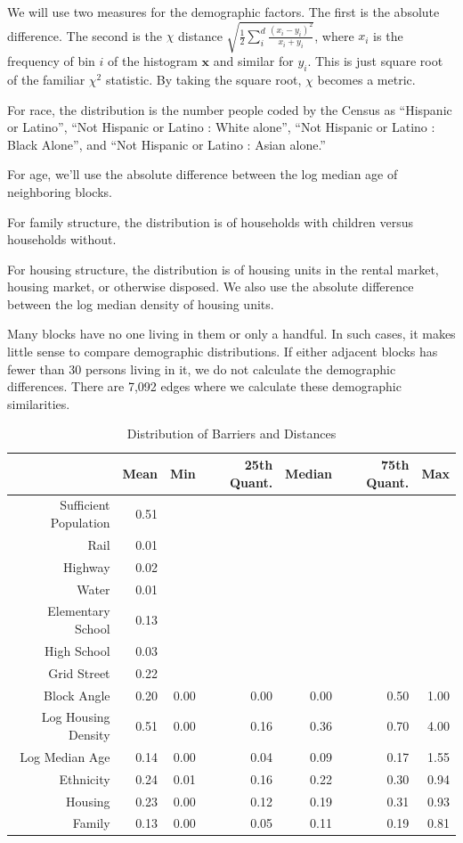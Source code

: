 \documentclass[12pt,letter]{article}\usepackage[]{graphicx}\usepackage[]{color}
\begin{document}
We will use two measures for the demographic factors. The first is the
absolute difference. The second is the $\chi$ distance $\sqrt{
\frac{1}{2} \sum_i^d \frac{(x_i - y_i)^2}{x_i + y_i}}$, where $x_i$ is
the frequency of bin $i$ of the histogram $\mathbf{x}$ and similar for
$y_i$. This is just square root of the familiar $\chi^2$ statistic. By
taking the square root, $\chi$ becomes a metric.\cite{pele_distance_2011}

For race, the distribution is the number people coded by the Census as
``Hispanic or Latino'', ``Not Hispanic or Latino : White alone'', ``Not Hispanic
or Latino : Black Alone'', and ``Not Hispanic or Latino : Asian alone.''

For age, we'll use the absolute difference between the log median age of
neighboring blocks.

For family structure, the distribution is of households with children
versus households without. 

For housing structure, the distribution is of housing units in the
rental market, housing market, or otherwise disposed. We also use the
absolute difference between the log median density of housing units.

Many blocks have no one living in them or only a handful. In such
cases, it makes little sense to compare demographic distributions. If
either adjacent blocks has fewer than 30 persons living in it, we do
not calculate the demographic differences. There are
7,092 edges where we calculate these
demographic similarities.

\begin{table}[ht]
\centering
\begin{tabular}{rrrrrrr}
  \hline
 & Mean & Min & 25th Quant. & Median & 75th Quant. & Max \\ 
  \hline
Sufficient Population & 0.51 &  &  &  &  &  \\ 
  Rail & 0.01 &  &  &  &  &  \\ 
  Highway & 0.02 &  &  &  &  &  \\ 
  Water & 0.01 &  &  &  &  &  \\ 
  Elementary School & 0.13 &  &  &  &  &  \\ 
  High School & 0.03 &  &  &  &  &  \\ 
  Grid Street & 0.22 &  &  &  &  &  \\ 
  Block Angle & 0.20 & 0.00 & 0.00 & 0.00 & 0.50 & 1.00 \\ 
  Log Housing Density & 0.51 & 0.00 & 0.16 & 0.36 & 0.70 & 4.00 \\ 
  Log Median Age & 0.14 & 0.00 & 0.04 & 0.09 & 0.17 & 1.55 \\ 
  Ethnicity & 0.24 & 0.01 & 0.16 & 0.22 & 0.30 & 0.94 \\ 
  Housing & 0.23 & 0.00 & 0.12 & 0.19 & 0.31 & 0.93 \\ 
  Family & 0.13 & 0.00 & 0.05 & 0.11 & 0.19 & 0.81 \\ 
   \hline
\end{tabular}
\caption{Distribution of Barriers and Distances} 
\label{tab:Distribution}
\end{table}
\end{document}
